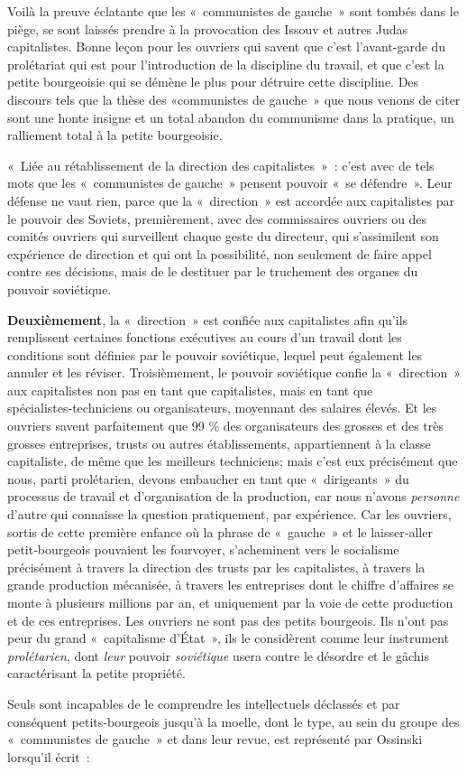 \documentclass[french,twoside]{book} %
\begin{document}
\noindent Voilà la preuve éclatante que les « communistes de gauche » sont tombés dans le piège, se sont laissés prendre à la provocation des Issouv et autres Judas capitalistes. Bonne leçon pour les ouvriers qui savent que c’est l’avant-garde du prolétariat qui est pour l’introduction de la discipline du travail, et que c’est la petite bourgeoisie qui se démène le plus pour détruire cette discipline. Des discours tels que la thèse des «communistes de gauche » que nous venons de citer sont une honte insigne et un total abandon du communisme dans la pratique, un ralliement total à la petite bourgeoisie.\par
« Liée au rétablissement de la direction des capitalistes » : c’est avec de tels mots que les \hspace{1em}« communistes de gauche » pensent pouvoir « se défendre ». Leur défense ne vaut rien, parce que la « direction » est accordée aux capitalistes par le pouvoir des Soviets, premièrement, avec des commissaires ouvriers ou des comités ouvriers qui surveillent chaque geste du directeur, qui s’assimilent son expérience de direction et qui ont la possibilité, non seulement de faire appel contre ses décisions, mais de le destituer par le truchement des organes du pouvoir soviétique.\par
\textbf{Deuxièmement}, la « direction » est confiée aux capitalistes afin qu’ils remplissent certaines fonctions exécutives au cours d’un travail dont les conditions sont définies par le pouvoir soviétique, lequel peut également les annuler et les réviser. Troisièmement, le pouvoir soviétique confie la « direction » aux capitalistes non pas en tant que capitalistes, mais en tant que spécialistes‑techniciens ou organisateurs, moyennant des salaires élevés. Et les ouvriers savent parfaitement que 99 \% des organisateurs des grosses et des très grosses entreprises, trusts ou autres établissements, appartiennent à la classe capitaliste, de même que les meilleurs techniciens; mais c’est eux précisément que nous, parti prolétarien, devons embaucher en tant que « dirigeants » du processus de travail et d’organisation de la production, car nous n’avons \emph{personne} d’autre qui connaisse la question pratiquement, par expérience. Car les ouvriers, sortis de cette première enfance où la phrase de « gauche » et le laisser‑aller petit‑bourgeois pouvaient les fourvoyer, s’acheminent vers le socialisme précisément à travers la direction des trusts par les capitalistes, à travers la grande production mécanisée, à travers les entreprises dont le chiffre d’affaires se monte à plusieurs millions par an, et uniquement par la voie de cette production et de ces entreprises. Les ouvriers ne sont pas des petits bourgeois. Ils n’ont pas peur du grand « capitalisme d’État », ils le considèrent comme leur instrument \emph{prolétarien}, dont \emph{leur} pouvoir \emph{soviétique} usera contre le désordre et le gâchis caractérisant la petite propriété.\par
Seuls sont incapables de le comprendre les intellectuels déclassés et par conséquent petits‑bourgeois jusqu’à la moelle, dont le type, au sein du groupe des « communistes de gauche » et dans leur revue, est représenté par Ossinski lorsqu’il écrit :\par
\end{document}
